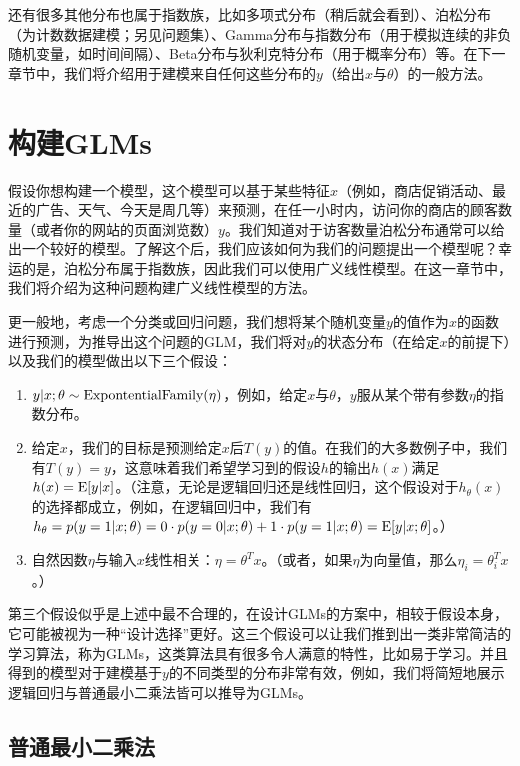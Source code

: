 还有很多其他分布也属于指数族，比如多项式分布（稍后就会看到）、泊松分布（为计数数据建模；另见问题集）、Gamma分布与指数分布（用于模拟连续的非负随机变量，如时间间隔）、Beta分布与狄利克特分布（用于概率分布）等。在下一章节中，我们将介绍用于建模来自任何这些分布的$y$（给出$x$与$\theta$）的一般方法。

\section{构建GLMs}

假设你想构建一个模型，这个模型可以基于某些特征$x$（例如，商店促销活动、最近的广告、天气、今天是周几等）来预测，在任一小时内，访问你的商店的顾客数量（或者你的网站的页面浏览数）$y$。我们知道对于访客数量泊松分布通常可以给出一个较好的模型。了解这个后，我们应该如何为我们的问题提出一个模型呢？幸运的是，泊松分布属于指数族，因此我们可以使用广义线性模型。在这一章节中，我们将介绍为这种问题构建广义线性模型的方法。

更一般地，考虑一个分类或回归问题，我们想将某个随机变量$y$的值作为$x$的函数进行预测，为推导出这个问题的GLM，我们将对$y$的状态分布（在给定$x$的前提下）以及我们的模型做出以下三个假设：

\begin{enumerate}
  \item $y|x;\theta \sim {\rm ExpontentialFamily(\eta)}$，例如，给定$x$与$\theta$，$y$服从某个带有参数$\eta$的指数分布。
  \item 给定$x$，我们的目标是预测给定$x$后$T(y)$的值。在我们的大多数例子中，我们有$T(y)=y$，这意味着我们希望学习到的假设$h$的输出$h(x)$满足$h(x)={\rm E}[y|x]$。（注意，无论是逻辑回归还是线性回归，这个假设对于$h_{\theta}(x)$的选择都成立，例如，在逻辑回归中，我们有$h_\theta=p(y=1|x;\theta)=0 \cdot p(y=0|x;\theta) + 1 \cdot p(y=1|x;\theta) = {\rm E}[y|x;\theta]$。）
  \item 自然因数$\eta$与输入$x$线性相关：$\eta = \theta^T x$。（或者，如果$\eta$为向量值，那么$\eta_i = \theta_i^T x$。）
\end{enumerate}

第三个假设似乎是上述中最不合理的，在设计GLMs的方案中，相较于假设本身，它可能被视为一种“设计选择”更好。这三个假设可以让我们推到出一类非常简洁的学习算法，称为GLMs，这类算法具有很多令人满意的特性，比如易于学习。并且得到的模型对于建模基于$y$的不同类型的分布非常有效，例如，我们将简短地展示逻辑回归与普通最小二乘法皆可以推导为GLMs。

\subsection{普通最小二乘法}

